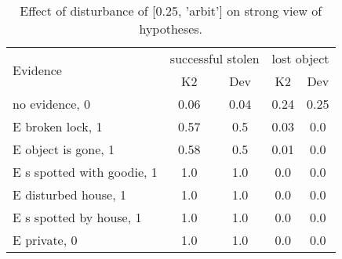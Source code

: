 \begin{table}\begin{tabular}{l|cc|cc}\toprule\multirow{2}{*}{Evidence} & \multicolumn{2}{c}{successful stolen}& \multicolumn{2}{c}{lost object}\\& {K2} & {Dev}& {K2} & {Dev}\\\midrule
no evidence, 0 & 0.06&0.04&0.24&0.25\\E broken lock, 1 & \cellcolor{Bittersweet}0.57&\cellcolor{Bittersweet}0.5&0.03&0.0\\E object is gone, 1 & \cellcolor{Bittersweet}0.58&\cellcolor{Bittersweet}0.5&0.01&0.0\\E s spotted with goodie, 1 & 1.0&1.0&0.0&0.0\\E disturbed house, 1 & 1.0&1.0&0.0&0.0\\E s spotted by house, 1 & 1.0&1.0&0.0&0.0\\E private, 0 & 1.0&1.0&0.0&0.0\\\bottomrule\end{tabular}\caption{Effect of disturbance of [0.25, 'arbit'] on strong view of hypotheses.}\end{table}